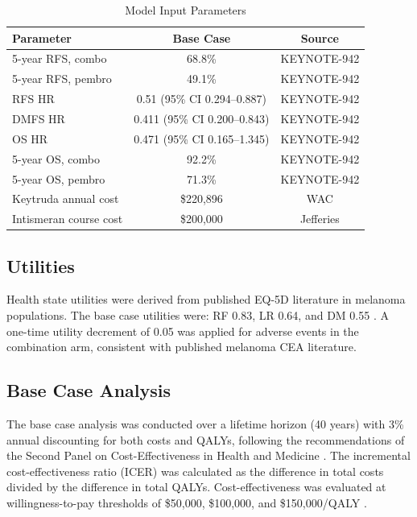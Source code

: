 \documentclass[12pt,a4paper]{article}
\begin{document}
\begin{table}[H]
\centering
\caption{Model Input Parameters}
\label{tab:inputs}
\begin{tabular}{lcc}
\toprule
\textbf{Parameter} & \textbf{Base Case} & \textbf{Source} \\
\midrule
5-year RFS, combo   & 68.8\%            & \mbox{KEYNOTE-942} \cite{khattak2026} \\
5-year RFS, pembro  & 49.1\%            & \mbox{KEYNOTE-942} \cite{khattak2026} \\
RFS HR              & 0.51 (95\% CI 0.294--0.887) & \mbox{KEYNOTE-942} \cite{khattak2026} \\
DMFS HR             & 0.411 (95\% CI 0.200--0.843) & \mbox{KEYNOTE-942} \cite{khattak2026} \\
OS HR               & 0.471 (95\% CI 0.165--1.345) & \mbox{KEYNOTE-942} \cite{khattak2026} \\
5-year OS, combo    & 92.2\%            & \mbox{KEYNOTE-942} \cite{khattak2026} \\
5-year OS, pembro   & 71.3\%            & \mbox{KEYNOTE-942} \cite{khattak2026} \\
Keytruda annual cost & \$220,896        & WAC \cite{keytruda2026} \\
Intismeran course cost & \$200,000       & Jefferies \cite{jefferies2026} \\
\bottomrule
\end{tabular}
\end{table}


\subsection{Utilities}

Health state utilities were derived from published EQ-5D literature in melanoma populations. The base case utilities were: RF 0.83, LR 0.64, and DM 0.55 \cite{bensimon2019, johnston2021, zhang2023}. A one-time utility decrement of 0.05 was applied for adverse events in the combination arm, consistent with published melanoma CEA literature.

\subsection{Base Case Analysis}

The base case analysis was conducted over a lifetime horizon (40 years) with 3\% annual discounting for both costs and QALYs, following the recommendations of the Second Panel on Cost-Effectiveness in Health and Medicine \cite{sanders2016}. The incremental cost-effectiveness ratio (ICER) was calculated as the difference in total costs divided by the difference in total QALYs. Cost-effectiveness was evaluated at willingness-to-pay thresholds of \$50,000, \$100,000, and \$150,000/QALY \cite{neumann2014}.
\end{document}
